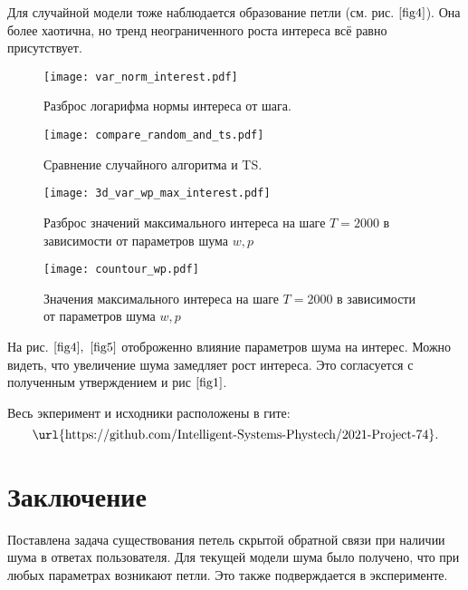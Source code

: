 \documentclass[12pt, twoside]{article}
\begin{document}

Для случайной модели тоже наблюдается образование петли (см. рис.$~\ref{fig4}$). 
Она более хаотична, но тренд неограниченного роста интереса всё равно присутствует.   


\begin{figure}[h]
  \begin{multicols}{2}
    \hfill
    \texttt{[image: var\_norm\_interest.pdf]}
    \hfill
    \caption{Разброс логарифма нормы интереса от шага.}
    \label{fig3}
    \hfill
    \texttt{[image: compare\_random\_and\_ts.pdf]}
    \hfill
    \caption{Сравнение случайного алгоритма и TS.}
    \label{fig4}
  \end{multicols}
\end{figure}


\begin{figure}[h]
  \begin{multicols}{2}
    \hfill
    \texttt{[image: 3d\_var\_wp\_max\_interest.pdf]}
    \hfill
    \caption{Разброс значений максимального интереса на шаге $T=2000$ в зависимости от параметров шума $w, p$}
    \label{fig5}
    \hfill
    \texttt{[image: countour\_wp.pdf]}
    \hfill
    \caption{Значения максимального интереса на шаге $T=2000$ в зависимости от параметров шума $w, p$}
    \label{fig6}
  \end{multicols}
\end{figure}

На рис.$~\ref{fig4},~\ref{fig5}$ отоброженно влияние параметров шума на интерес. 
Можно видеть, что увеличение шума замедляет рост интереса. 
Это согласуется с полученным утверждением и рис$~\ref{fig1}$.

Весь экперимент и исходники расположены в гите: 
\[  \text{\url{https://github.com/Intelligent-Systems-Phystech/2021-Project-74}}. \]

\section{Заключение}
Поставлена задача существования петель скрытой обратной связи при наличии шума в ответах пользователя. 
Для текущей модели шума было получено, что при любых параметрах возникают петли. 
Это также подверждается в эксперименте.
\end{document}
